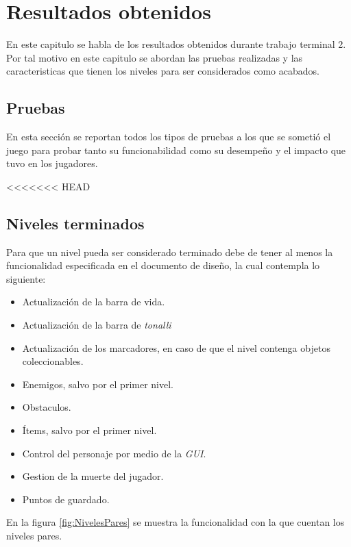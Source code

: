 \chapter{Resultados obtenidos}
En este capitulo se habla de los resultados obtenidos durante trabajo terminal 2. 
Por tal motivo en este capitulo se abordan las pruebas realizadas y las 
caracteristicas que tienen los niveles para ser considerados como acabados.






\section{Pruebas}
En esta sección se reportan todos los tipos de pruebas a los que se sometió el 
juego para probar tanto su funcionabilidad como su desempeño y el impacto que 
tuvo en los jugadores.









<<<<<<< HEAD
\section{Niveles terminados}
Para que un nivel pueda ser considerado terminado debe de tener al menos la 
funcionalidad especificada en el documento de diseño, la cual contempla lo 
siguiente: 
\begin{itemize}
	\item Actualización de la barra de vida.
	\item Actualización de la barra de \textit{tonalli}
	\item Actualización de los marcadores, en caso de que el nivel contenga objetos 
	coleccionables.
	\item Enemigos, salvo por el primer nivel.
	\item Obstaculos.
	\item Ítems, salvo por el primer nivel.
	\item Control del personaje por medio de la \textit{GUI}.
	\item Gestion de la muerte del jugador.
	\item Puntos de guardado.
\end{itemize} 

En la figura \ref{fig:NivelesPares} se muestra la funcionalidad con la que cuentan los niveles pares.
		
